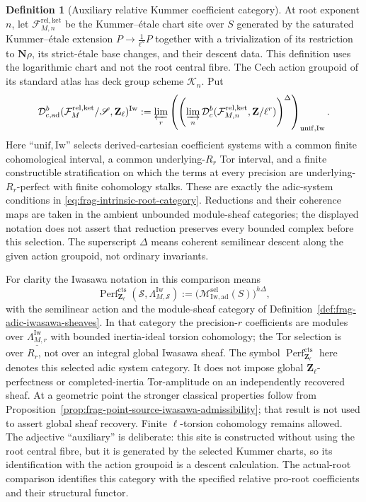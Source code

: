 \documentclass[11pt]{article}
\theoremstyle{definition}
\newtheorem{definition}[theorem]{Definition}
\theoremstyle{remark}
\begin{document}
\begin{definition}[Auxiliary relative Kummer coefficient category]
\label{def:frag-relative-kummer-category}
At root exponent $n$, let
$\mathcal F_{M,n}^{\mathrm{rel,ket}}$ be the Kummer--\'{e}tale chart site over
$S$ generated by the saturated Kummer--\'{e}tale extension
$P\to\frac1{\ell^n}P$ together with a trivialization of its restriction to
$\mathbf N\rho$, its strict-\'{e}tale base changes, and their descent data.
This definition uses the logarithmic chart and not the root central fibre.
The Cech action groupoid of its standard atlas has deck group scheme
$\mathcal K_n$.  Put
\begin{equation}
 \mathcal D^b_{c,\mathrm{ad}}
 (\mathcal F_M^{\mathrm{rel,ket}}/\mathscr S,\mathbf Z_\ell)^{\mathrm{Iw}}
 :=\varprojlim_r\left(
 \left(\varinjlim_n
 \mathcal D^b_c(\mathcal F_{M,n}^{\mathrm{rel,ket}},
                  \mathbf Z/\ell^r)\right)^\Delta
 \right)_{\mathrm{unif,Iw}}.
 \label{eq:frag-relative-kummer-double-category}
\end{equation}
Here ``$\mathrm{unif,Iw}$'' selects derived-cartesian coefficient
systems with a common finite cohomological interval, a common
underlying-$R_r$ Tor interval, and a finite constructible
stratification on which the terms at every precision are
underlying-$R_r$-perfect with finite cohomology stalks.
These are exactly the adic-system conditions in
\eqref{eq:frag-intrinsic-root-category}.  Reductions and their
coherence maps are taken in the ambient unbounded module-sheaf
categories; the displayed notation does not assert that reduction
preserves every bounded complex before this selection.
The superscript $\Delta$ means coherent semilinear descent along
the given action groupoid, not ordinary invariants.

For clarity the Iwasawa notation in this comparison means
\[
 \operatorname{Perf}^{\mathrm{cts}}_{\mathbf Z_\ell}
 (\mathscr S,\Lambda_{M,\mathscr S}^{\mathrm{Iw}})
 :=\bigl(\mathcal M_{\mathrm{Iw,ad}}^{\mathrm{sel}}(S)\bigr)^{h\Delta},
\]
with the semilinear action and the module-sheaf category of
Definition~\ref{def:frag-adic-iwasawa-sheaves}.
In that category the precision-$r$ coefficients are modules over
$\underline{\Lambda_{M,r}^{\mathrm{Iw}}}$ with bounded inertia-ideal
torsion cohomology; the Tor selection is over $R_r$, not over an
integral global Iwasawa sheaf.  The symbol
$\operatorname{Perf}^{\mathrm{cts}}_{\mathbf Z_\ell}$ here denotes
this selected adic system category.  It does not impose global
$\mathbf Z_\ell$-perfectness or completed-inertia Tor-amplitude on
an independently recovered sheaf.  At a geometric point the stronger
classical properties follow from
Proposition~\ref{prop:frag-point-source-iwasawa-admissibility};
that result is not used to assert global sheaf recovery.
Finite $\ell$-torsion cohomology remains allowed.
The adjective ``auxiliary'' is deliberate: this site is constructed without
using the root central fibre, but it is generated by the selected Kummer
charts, so its identification with the action groupoid is a descent
calculation.  The actual-root comparison identifies this category
with the specified relative pro-root coefficients and their structural
functor.
\end{definition}
\end{document}
